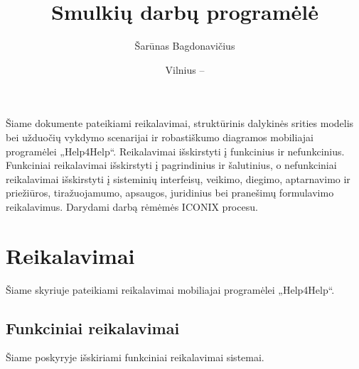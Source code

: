 \documentclass{VUMIFPSbakalaurinis}
\title{Smulkių darbų programėlė}
\author{Šarūnas Bagdonavičius}
\date{Vilnius – \the\year}
\begin{document}
\maketitle
\tableofcontents

Šiame dokumente pateikiami reikalavimai, struktūrinis dalykinės srities modelis bei užduočių vykdymo scenarijai ir robastiškumo diagramos mobiliajai programėlei „Help4Help“. Reikalavimai išskirstyti į funkcinius ir nefunkcinius. Funkciniai reikalavimai išskirstyti į pagrindinius ir šalutinius, o nefunkciniai reikalavimai išskirstyti į sisteminių interfeisų, veikimo, diegimo, aptarnavimo ir priežiūros, tiražuojamumo, apsaugos, juridinius bei pranešimų formulavimo reikalavimus. Darydami darbą rėmėmės ICONIX procesu.

\section{Reikalavimai}
Šiame skyriuje pateikiami reikalavimai mobiliajai programėlei „Help4Help“.
\subsection{Funkciniai reikalavimai}
Šiame poskyryje išskiriami funkciniai reikalavimai sistemai.
\end{document}
